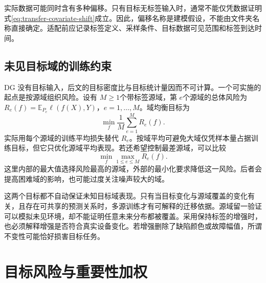 实际数据可能同时含有多种偏移。只有目标无标签输入时，通常不能仅凭数据证明式\eqref{eq:transfer-covariate-shift}成立。因此，偏移名称是建模假设，不能由文件夹名称直接确定。适配前应记录标签定义、采样条件、目标数据可见范围和标签到达时间。

\subsection{未见目标域的训练约束}
DG 没有目标输入，后文的目标密度比与目标统计量因而不可计算。一个可实施的起点是按源域组织风险。设有 $M\geq1$个带标签源域，第 $e$个源域的总体风险为 $R_e(f)=\mathbb E_{P_e}\ell(f(X),Y)$，$e=1,\ldots,M$。域均衡目标为
\begin{equation}
 \min_f\frac1M\sum_{e=1}^M R_e(f).
\end{equation}
实际用每个源域的训练平均损失替代 $R_e$。按域平均可避免大域仅凭样本量占据训练目标，但它只优化源域平均表现。若还希望控制最差源域，可以比较
\begin{equation}
 \min_f\max_{1\leq e\leq M}R_e(f).
\end{equation}
这里内部的最大值选择风险最高的源域，外部的最小化要求降低这一风险。后者会提高困难域的影响，也可能过度关注噪声较大的域。

这两个目标都不自动保证未知目标域表现。只有当目标变化与源域覆盖的变化有关，且存在可共享的预测关系时，多源训练才有可解释的迁移依据。源域留一验证可以模拟未见环境，却不能证明任意未来分布都被覆盖。采用保持标签的增强时，也必须解释增强是否符合真实设备变化。若增强删除了缺陷颜色或故障幅值，所谓不变性可能恰好损害目标任务。

\section{目标风险与重要性加权}

